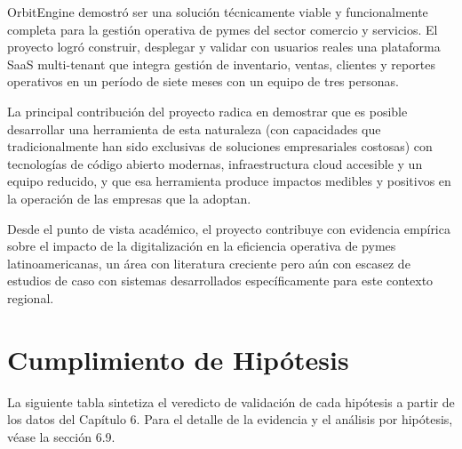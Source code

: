 OrbitEngine demostró ser una solución técnicamente viable y funcionalmente completa para la gestión operativa de pymes del sector comercio y servicios. El proyecto logró construir, desplegar y validar con usuarios reales una plataforma SaaS multi-tenant que integra gestión de inventario, ventas, clientes y reportes operativos en un período de siete meses con un equipo de tres personas.

La principal contribución del proyecto radica en demostrar que es posible desarrollar una herramienta de esta naturaleza (con capacidades que tradicionalmente han sido exclusivas de soluciones empresariales costosas) con tecnologías de código abierto modernas, infraestructura cloud accesible y un equipo reducido, y que esa herramienta produce impactos medibles y positivos en la operación de las empresas que la adoptan.

Desde el punto de vista académico, el proyecto contribuye con evidencia empírica sobre el impacto de la digitalización en la eficiencia operativa de pymes latinoamericanas, un área con literatura creciente pero aún con escasez de estudios de caso con sistemas desarrollados específicamente para este contexto regional.

\section{Cumplimiento de Hipótesis}\label{cumplimiento-de-hipuxf3tesis}

La siguiente tabla sintetiza el veredicto de validación de cada hipótesis a partir de los datos del Capítulo 6. Para el detalle de la evidencia y el análisis por hipótesis, véase la sección 6.9.

